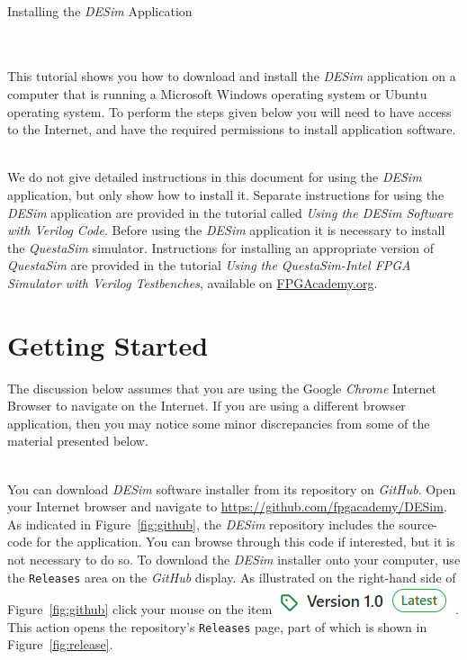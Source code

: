 \documentclass[epsfig,10pt,fullpage]{article} \addtolength{\textwidth}{1.5in}
\begin{document}
~\\
\centerline{\huge Installing the {\it DESim} Application}
~\\
~\\
This tutorial shows you how to download and install the {\it DESim} application
on a computer that is running a Microsoft Windows operating system or Ubuntu operating system.  
To perform the steps given below you will need to have 
access to the Internet, and have the required permissions to install application software.

~\\
\noindent
We do not give detailed instructions in this document for using the {\it DESim} application, 
but only show how to install it. Separate instructions for using the {\it DESim} application 
are provided in the tutorial called {\it Using the DESim Software with Verilog Code}.
Before using the {\it DESim} application it is necessary to install the {\it QuestaSim} 
simulator. Instructions for installing an appropriate version of {\it QuestaSim} are
provided in the tutorial {\it Using the QuestaSim-Intel FPGA Simulator with Verilog
Testbenches}, available on \href{https://www.fpgacademy.org/tutorials.html}{FPGAcademy.org}. 

\section*{Getting Started}

The discussion below assumes that you are using the Google {\it Chrome} Internet Browser to
navigate on the Internet.  If you are using a different browser application, then you may
notice some minor discrepancies from some of the material presented below. 

~\\
\noindent
You can download {\it DESim} software installer from its repository on {\it GitHub}. 
Open your Internet browser and navigate to \url{https://github.com/fpgacademy/DESim}.
As indicated in Figure~\ref{fig:github}, the {\it DESim} repository includes the source-code 
for the application. You can browse through this code if interested, but it is not necessary to
do so. To download the {\it DESim} installer onto your computer, use the 
\texttt{Releases} area on the {\it GitHub} display. As illustrated on the right-hand side of
Figure~\ref{fig:github} click your mouse on the item 
\includegraphics[height=\baselineskip]{figures/label.png}. This action opens the
repository's \texttt{Releases} page, part of which is shown in Figure~\ref{fig:release}.
\end{document}
